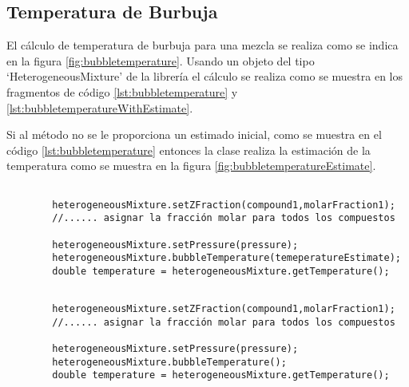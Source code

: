\subsection{Temperatura de Burbuja}

	El cálculo de temperatura de burbuja para una mezcla se realiza como se indica en la figura \ref{fig:bubbletemperature}. Usando un objeto del tipo `HeterogeneousMixture' de la librería \Materia el cálculo se realiza como se muestra en los fragmentos de código \ref{lst:bubbletemperature} y \ref{lst:bubbletemperatureWithEstimate}.

	Si al método no se le proporciona un estimado inicial, como se muestra en el código \ref{lst:bubbletemperature} entonces la clase realiza la estimación de la temperatura como se muestra en la figura \ref{fig:bubbletemperatureEstimate}. 

	\begin{lstlisting}[label={lst:bubbletemperatureWithEstimate},caption={Cálculo de la temperatura de burbuja proporcionando un estimado inicial.}]

		heterogeneousMixture.setZFraction(compound1,molarFraction1);
		//...... asignar la fracción molar para todos los compuestos

		heterogeneousMixture.setPressure(pressure);
		heterogeneousMixture.bubbleTemperature(temeperatureEstimate);
		double temperature = heterogeneousMixture.getTemperature();
	\end{lstlisting}


	\begin{lstlisting}[label={lst:bubbletemperature},caption={Cálculo de la temperatura de burbuja.}]

		heterogeneousMixture.setZFraction(compound1,molarFraction1);
		//...... asignar la fracción molar para todos los compuestos

		heterogeneousMixture.setPressure(pressure);
		heterogeneousMixture.bubbleTemperature();
		double temperature = heterogeneousMixture.getTemperature();
	\end{lstlisting}


\begin{figure}[!h]
	\centering	
	\caption{}\label{fig:bubblePressure}
\end{figure}

